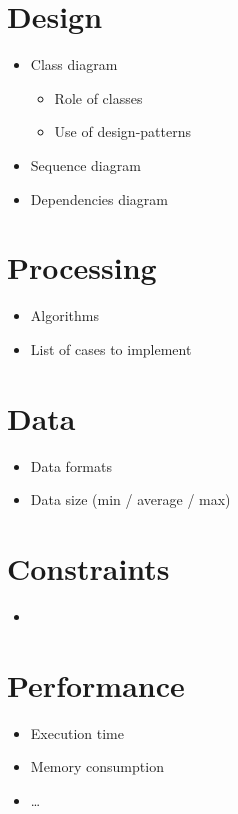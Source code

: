 \documentclass[10pt]{article}
\begin{document}
  \section*{Design}
  \begin{itemize}
    \item Class diagram
    \begin{itemize}
      \item Role of classes
      \item Use of design-patterns
    \end{itemize}
    \item Sequence diagram
    \item Dependencies diagram
  \end{itemize}

  \section*{Processing}
  \begin{itemize}
    \item Algorithms
    \item List of cases to implement
  \end{itemize}
  
  \section*{Data}
  \begin{itemize}    
    \item Data formats
    \item Data size (min / average / max)
  \end{itemize}
  
  \section*{Constraints}
  \begin{itemize}
    \item 
  \end{itemize}

  \section*{Performance}
  \begin{itemize}
    \item Execution time
    \item Memory consumption
    \item \ldots
  \end{itemize}    
  
\end{document}

